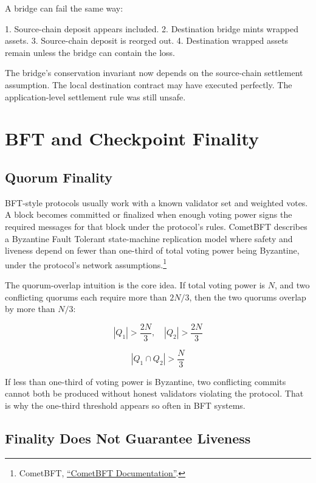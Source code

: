 A bridge can fail the same way:

\begin{codeblock}
1. Source-chain deposit appears included.
2. Destination bridge mints wrapped assets.
3. Source-chain deposit is reorged out.
4. Destination wrapped assets remain unless the bridge can contain the loss.
\end{codeblock}

The bridge's conservation invariant now depends on the source-chain settlement assumption. The local destination contract may have executed perfectly. The application-level settlement rule was still unsafe.

\section{BFT and Checkpoint Finality}

\subsection{Quorum Finality}

BFT-style protocols usually work with a known validator set and weighted votes. A block becomes committed or finalized when enough voting power signs the required messages for that block under the protocol's rules. CometBFT describes a Byzantine Fault Tolerant state-machine replication model where safety and liveness depend on fewer than one-third of total voting power being Byzantine, under the protocol's network assumptions.\footnote{CometBFT, \href{https://docs.cometbft.com/}{``CometBFT Documentation''}.}

The quorum-overlap intuition is the core idea. If total voting power is \(N\), and two conflicting quorums each require more than \(2N/3\), then the two quorums overlap by more than \(N/3\):

\[
|Q_1| > \frac{2N}{3}, \quad |Q_2| > \frac{2N}{3}
\]

\[
|Q_1 \cap Q_2| > \frac{N}{3}
\]

If less than one-third of voting power is Byzantine, two conflicting commits cannot both be produced without honest validators violating the protocol. That is why the one-third threshold appears so often in BFT systems.

\subsection{Finality Does Not Guarantee Liveness}

